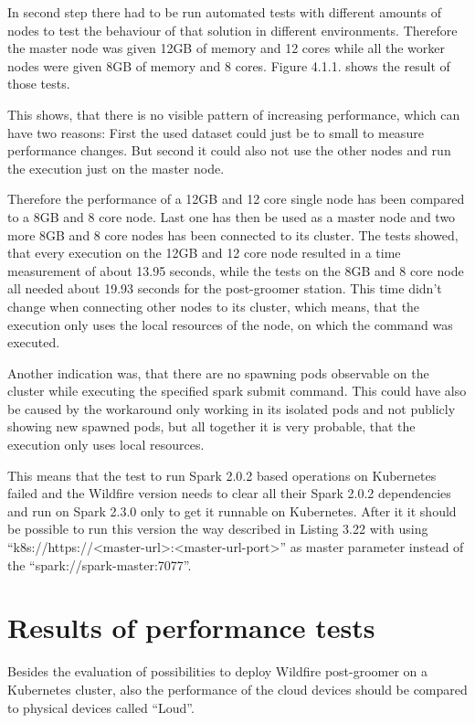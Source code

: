In second step there had to be run automated tests with different amounts of nodes to test the behaviour of that solution in different environments. Therefore the master node was given 12GB of memory and 12 cores while all the worker nodes were given 8GB of memory and 8 cores. Figure 4.1.1. shows the result of those tests.

This shows, that there is no visible pattern of increasing performance, which can have two reasons: First the used dataset could just be to small to measure performance changes. But second it could also not use the other nodes and run the execution just on the master node.

Therefore the performance of a 12GB and 12 core single node has been compared to a 8GB and 8 core node. Last one has then be used as a master node and two more 8GB and 8 core nodes has been connected to its cluster. The tests showed, that every execution on the 12GB and 12 core node resulted in a time measurement of about 13.95 seconds, while the tests on the 8GB and 8 core node all needed about 19.93 seconds for the post-groomer station. This time didn't change when connecting other nodes to its cluster, which means, that the execution only uses the local resources of the node, on which the command was executed.

Another indication was, that there are no spawning pods observable on the cluster while executing the specified spark submit command. This could have also be caused by the workaround only working in its isolated pods and not publicly showing new spawned pods, but all together it is very probable, that the execution only uses local resources.

This means that the test to run Spark 2.0.2 based operations on Kubernetes failed and the Wildfire version needs to clear all their Spark 2.0.2 dependencies and run on Spark 2.3.0 only to get it runnable on Kubernetes. After it it should be possible to run this version the way described in Listing 3.22 with using ``k8s://https://<master-url>:<master-url-port>'' as master parameter instead of the ``spark://spark-master:7077''.

\section{Results of performance tests}

Besides the evaluation of possibilities to deploy Wildfire post-groomer on a Kubernetes cluster, also the performance of the cloud devices should be compared to physical devices called ``Loud''.

